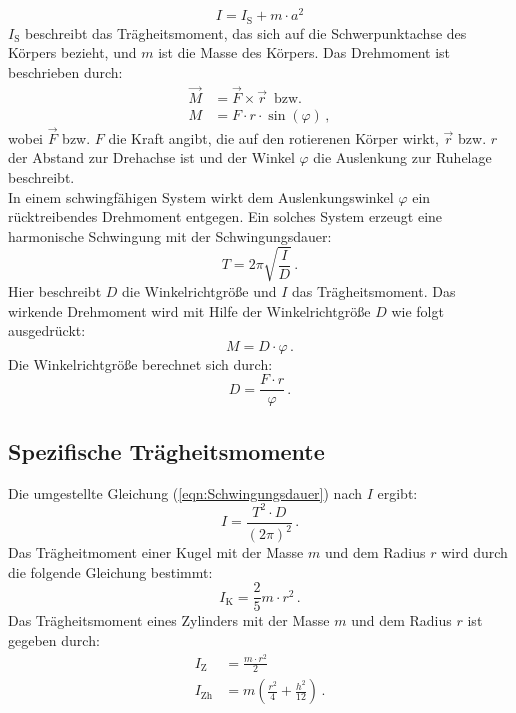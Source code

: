 \begin{equation}
    I = I_{\text{S}} + m \cdot a^{2}
    \label{eqn:SatzVonSteiner}
\end{equation}
%
$I_{\text{S}}$ beschreibt das Trägheitsmoment, das sich auf die Schwerpunktachse des Körpers bezieht, und $m$
ist die Masse des Körpers. 
Das Drehmoment ist beschrieben durch:
\begin{align}
    \vec{M} &= \vec{F} \times \vec {r}\, \text{  bzw.} \label{eqn:DrehmomentVektor} \\
    M &= F \cdot r \cdot \sin \left(\varphi \right) \,, \label{eqn:DrehmomentSkalar}
\end{align}
%
wobei $\vec{F}$ bzw. $F$ die Kraft angibt, die auf den rotierenen Körper wirkt, $\vec{r}$ 
bzw. $r$ der Abstand zur Drehachse ist und der Winkel $\varphi$ die Auslenkung zur
Ruhelage beschreibt. \\
In einem schwingfähigen System wirkt dem Auslenkungswinkel $\varphi$ ein rücktreibendes Drehmoment entgegen.
Ein solches System erzeugt eine harmonische Schwingung mit der Schwingungsdauer: 
\begin{equation}
    T = 2 \pi \sqrt{\frac{I}{D}}\,.
    \label{eqn:Schwingungsdauer}
 \end{equation}
Hier beschreibt $D$ die Winkelrichtgröße und $I$ das Trägheitsmoment.  
Das wirkende Drehmoment wird mit Hilfe der Winkelrichtgröße $D$ wie folgt ausgedrückt:
\begin{equation}
   M = D \cdot \varphi\,.
   \label{eqn:DrehmomentMitWinkelrichtgröße}
\end{equation}
%
Die Winkelrichtgröße berechnet sich durch: 
\begin{equation}
   D = \frac{F \cdot r}{\varphi}\,.
    \label{eqn:Winkelrichtgröße}
\end{equation}
%
\subsection{Spezifische Trägheitsmomente}
\label{sec:Trägheitsmomente}
Die umgestellte Gleichung (\ref{eqn:Schwingungsdauer}) nach $I$ ergibt:
\begin{equation}
    I = \frac{T^{2} \cdot D}{\left(2 \pi\right)^{2}}\,.
    \label{eqn:TragheitmomentAusSchwingungsdauer}
\end{equation}
%
Das Trägheitmoment einer Kugel mit der Masse $m$ und dem Radius $r$ wird durch die folgende Gleichung
bestimmt: 
\begin{equation}
    I_{\text{K}} = \frac{2}{5}m \cdot r^{2}\,.
    \label{eqn:TragheitKugel}
\end{equation}
Das Trägheitsmoment eines Zylinders mit der Masse $m$ und dem Radius $r$ ist gegeben 
durch:
\begin{align}
    I_{\text{Z}} &= \frac{m \cdot r^2}{2} \label{eqn:TragheitZylinder} \\
    I_{\text{Zh}} &= m \left(\frac{r^{2}}{4} + \frac{h^{2}}{12} \right) \label{eqn:TrägheitZylinderQuer}\,.
\end{align}
%
%
